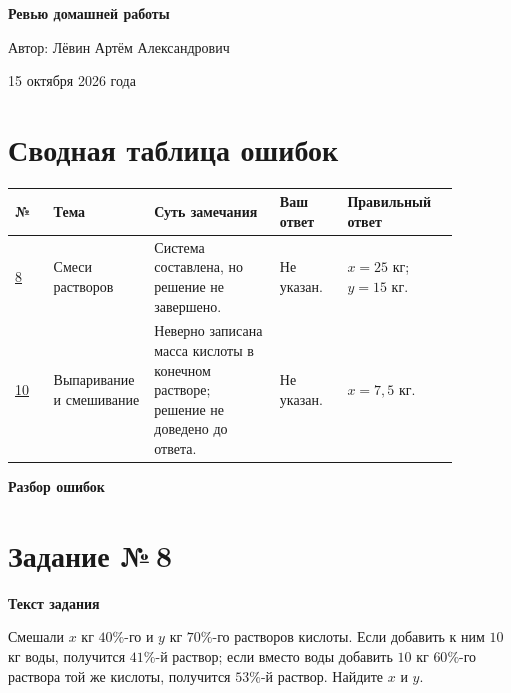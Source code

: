\documentclass[12pt,a4paper]{article}
\newcommand{\problemheading}[1]{\section*{Задание №\,#1}}
\newcommand{\subblock}[1]{\vspace{4pt}\noindent\textbf{#1}\par}
\begin{document}
\thispagestyle{empty}
\vspace*{0.29\textheight}
\begin{center}
  {\LARGE\bfseries Ревью домашней работы\par}
  \vspace{18mm}
  {\large Автор: Лёвин Артём Александрович\par}
  \vspace{8mm}
  {\large 15 октября 2026 года\par}
\end{center}
\vfill
\begin{center}
\end{center}
\vspace{10mm}
\newpage

\section*{Сводная таблица ошибок}
\begingroup
\small
\setlength{\tabcolsep}{3pt}
\renewcommand{\arraystretch}{1.45}
\begin{tabular}{@{}p{0.085\linewidth}p{0.155\linewidth}p{0.265\linewidth}p{0.145\linewidth}p{0.23\linewidth}@{}}
\toprule
\textbf{№} & \textbf{Тема} & \textbf{Суть замечания} & \textbf{Ваш ответ} & \textbf{Правильный ответ}\\
\midrule
\hyperref[task:8]{8} & Смеси растворов & Система составлена, но решение не завершено. & Не указан. & $x=25$ кг; $y=15$ кг.\\
\addlinespace[2mm]
\hyperref[task:10]{10} & Выпаривание и смешивание & Неверно записана масса кислоты в конечном растворе; решение не доведено до ответа. & Не указан. & $x=7{,}5$ кг.\\
\bottomrule
\end{tabular}
\endgroup

\newpage
\thispagestyle{empty}
\vspace*{\fill}
\begin{center}
{\LARGE\bfseries Разбор ошибок}
\end{center}
\vspace*{\fill}
\newpage

\label{task:8}
\problemheading{8}
\subblock{Текст задания}
Смешали $x$ кг $40\%$-го и $y$ кг $70\%$-го растворов кислоты.
Если добавить к ним $10$ кг воды, получится $41\%$-й раствор;
если вместо воды добавить $10$ кг $60\%$-го раствора той же кислоты,
получится $53\%$-й раствор. Найдите $x$ и $y$.
\end{document}
